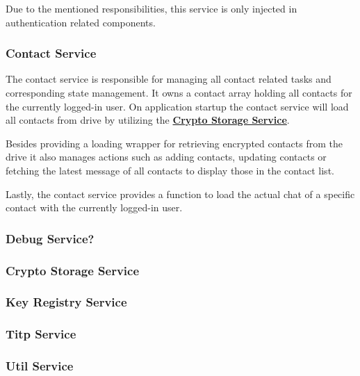 Due to the mentioned responsibilities, this service is only injected in authentication related components.

\subsubsection{Contact Service}\label{subsubsec:contact-service}

The contact service is responsible for managing all contact related tasks and corresponding state management.
It owns a contact array holding all contacts for the currently logged-in user.
On application startup the contact service will load all contacts from drive by utilizing the
\textbf{\hyperref[subsubsec:crypto-storage-service]{Crypto Storage Service}}.

Besides providing a loading wrapper for retrieving encrypted contacts from the drive it also manages actions such as
adding contacts, updating contacts or fetching the latest message of all contacts to display those in the contact list.

Lastly, the contact service provides a function to load the actual chat of a specific contact with the currently
logged-in user.


\subsubsection{Debug Service?}

\subsubsection{Crypto Storage Service}

\subsubsection{Key Registry Service}

\subsubsection{Titp Service}

\subsubsection{Util Service}

